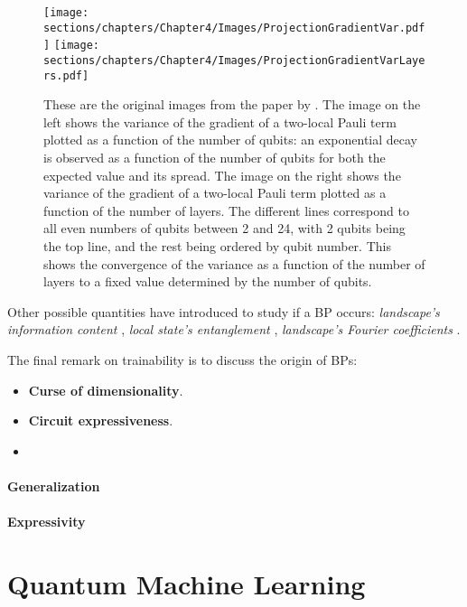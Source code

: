 \begin{figure}
    \centering
    \texttt{[image: sections/chapters/Chapter4/Images/ProjectionGradientVar.pdf]}
    \texttt{[image: sections/chapters/Chapter4/Images/ProjectionGradientVarLayers.pdf]}
    \caption{These are the original images from the paper by \cite{McClean_2018}. 
    The image on the left shows the variance of the gradient of a two-local Pauli term plotted as a function of 
    the number of qubits: an exponential decay is observed as a function of the number 
    of qubits for both the expected value and its spread.
    The image on the right shows the variance of the gradient of a two-local Pauli term plotted as a function of the 
    number of layers. The different lines correspond to all even numbers of qubits between 
    2 and 24, with 2 qubits being the top line, and the rest being ordered by qubit number. This shows 
    the convergence of the variance as a function of the number of layers to a fixed value determined by the 
    number of qubits.
    }
    \label{figure:McClean}
\end{figure}

Other possible quantities have introduced to study if a BP occurs: \textit{landscape's information content} \cite{P_rez_Salinas_2024}, 
\textit{local state's entanglement} \cite{Sack_2022}, \textit{landscape's Fourier coefficients} \cite{okumura2023, Nemkov_2023}.

The final remark on trainability is to discuss the origin of BPs:

\begin{itemize}
    \item \textbf{Curse of dimensionality}.\\
    \item \textbf{Circuit expressiveness}.\\
    \item 
\end{itemize}

\paragraph{Generalization}


\paragraph{Expressivity}



\section{Quantum Machine Learning}

